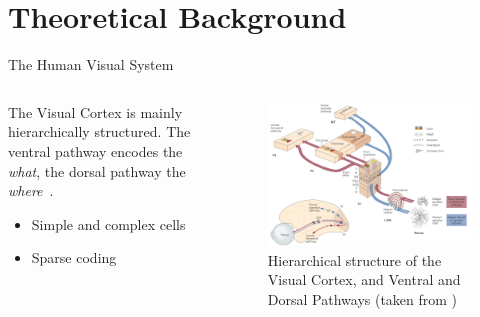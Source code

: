\documentclass{beamer}
\begin{document}
\section{Theoretical Background}
\begin{frame}{The Human Visual System}
\begin{columns}
\begin{column}{0.48\textwidth}
The Visual Cortex is mainly hierarchically structured.
The ventral pathway encodes the \textit{what}, the dorsal pathway the \textit{where}~\cite{goodale1992separate}.

\begin{itemize}
\item Simple and complex cells
\item Sparse coding
\end{itemize}
\end{column}
\begin{column}{0.48\textwidth}
\begin{figure}
\centering
\includegraphics[width=\textwidth]{pres_imgs/ventral_dorsal.png}
\caption{Hierarchical structure of the Visual Cortex, and Ventral and Dorsal Pathways (taken from \cite[p. 571]{mack2013principles})}
\label{fig:figure_ventral_dorsal}
\end{figure}
\end{column}
\end{columns}
\end{frame}
\end{document}
